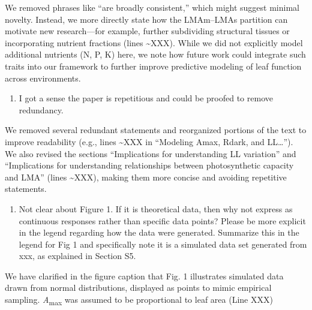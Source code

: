 \documentclass[
  12pt,
  letterpaper,
  DIV=11,
  numbers=noendperiod]{scrartcl}
\providecommand{\tightlist}{%
  \setlength{\itemsep}{0pt}\setlength{\parskip}{0pt}}\usepackage{longtable,booktabs,array}
\renewenvironment{quote}
  {\begin{customblockquote}\color{blockquote-text}\ignorespaces}
  {\end{customblockquote}}
\begin{document}
We removed phrases like ``are broadly consistent,'' which might suggest
minimal novelty. Instead, we more directly state how the LMAm--LMAs
partition can motivate new research---for example, further subdividing
structural tissues or incorporating nutrient fractions (lines
\textasciitilde XXX). While we did not explicitly model additional
nutrients (N, P, K) here, we note how future work could integrate such
traits into our framework to further improve predictive modeling of leaf
function across environments.

\begin{quote}
\begin{enumerate}
\def\labelenumi{\arabic{enumi})}
\setcounter{enumi}{4}
\tightlist
\item
  I got a sense the paper is repetitious and could be proofed to remove
  redundancy.
\end{enumerate}
\end{quote}

We removed several redundant statements and reorganized portions of the
text to improve readability (e.g., lines \textasciitilde XXX in
``Modeling Amax, Rdark, and LL\ldots{}''). We also revised the sections
``Implications for understanding LL variation'' and ``Implications for
understanding relationships between photosynthetic capacity and LMA''
(lines \textasciitilde XXX), making them more concise and avoiding
repetitive statements.

\begin{quote}
\begin{enumerate}
\def\labelenumi{\arabic{enumi})}
\setcounter{enumi}{5}
\tightlist
\item
  Not clear about Figure 1. If it is theoretical data, then why not
  express as continuous responses rather than specific data points?
  Please be more explicit in the legend regarding how the data were
  generated. Summarize this in the legend for Fig 1 and specifically
  note it is a simulated data set generated from xxx, as explained in
  Section S5.
\end{enumerate}
\end{quote}

We have clarified in the figure caption that Fig. 1 illustrates
simulated data drawn from normal distributions, displayed as points to
mimic empirical sampling. \emph{A}\textsubscript{max} was assumed to be
proportional to leaf area (Line XXX)
\end{document}
